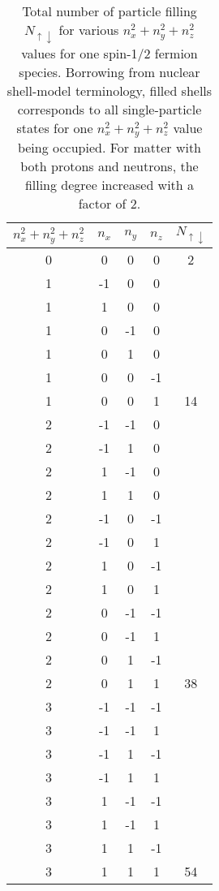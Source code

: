 \documentclass[thesis.tex]{subfiles}
\begin{document}
\begin{table}
\begin{center}
\caption{Total number of particle filling $N_{\uparrow \downarrow }$
  for various $n_{x}^{2}+n_{y}^{2}+n_{z}^{2}$ values for one spin-1/2
  fermion species.  Borrowing from nuclear shell-model terminology,
  filled shells corresponds to all single-particle states for one
  $n_{x}^{2}+n_{y}^{2}+n_{z}^{2}$ value being occupied.  For matter
  with both protons and neutrons, the filling degree increased with a
  factor of $2$.} \label{tab:table1}
\begin{tabular}{ccccc}
\hline \multicolumn{1}{c}{ $n_{x}^{2}+n_{y}^{2}+n_{z}^{2}$ } &
\multicolumn{1}{c}{ $n_{x}$ } & \multicolumn{1}{c}{ $n_{y}$ } &
\multicolumn{1}{c}{ $n_{z}$ } & \multicolumn{1}{c}{ $N_{\uparrow
    \downarrow }$ } \\ \hline 0 & 0 & 0 & 0 & 2 \\ \hline 1 & -1 & 0 &
0 & \\ 1 & 1 & 0 & 0 & \\ 1 & 0 & -1 & 0 & \\ 1 & 0 & 1 & 0 & \\ 1 & 0
& 0 & -1 & \\ 1 & 0 & 0 & 1 & 14 \\ \hline 2 & -1 & -1 & 0 & \\ 2 & -1
& 1 & 0 & \\ 2 & 1 & -1 & 0 & \\ 2 & 1 & 1 & 0 & \\ 2 & -1 & 0 & -1 &
\\ 2 & -1 & 0 & 1 & \\ 2 & 1 & 0 & -1 & \\ 2 & 1 & 0 & 1 & \\ 2 & 0 &
-1 & -1 & \\ 2 & 0 & -1 & 1 & \\ 2 & 0 & 1 & -1 & \\ 2 & 0 & 1 & 1 &
38 \\ \hline 3 & -1 & -1 & -1 & \\ 3 & -1 & -1 & 1 & \\ 3 & -1 & 1 &
-1 & \\ 3 & -1 & 1 & 1 & \\ 3 & 1 & -1 & -1 & \\ 3 & 1 & -1 & 1 & \\ 3
& 1 & 1 & -1 & \\ 3 & 1 & 1 & 1 & 54 \\ \hline
\end{tabular}
\end{center}
\end{table}
\end{document}
